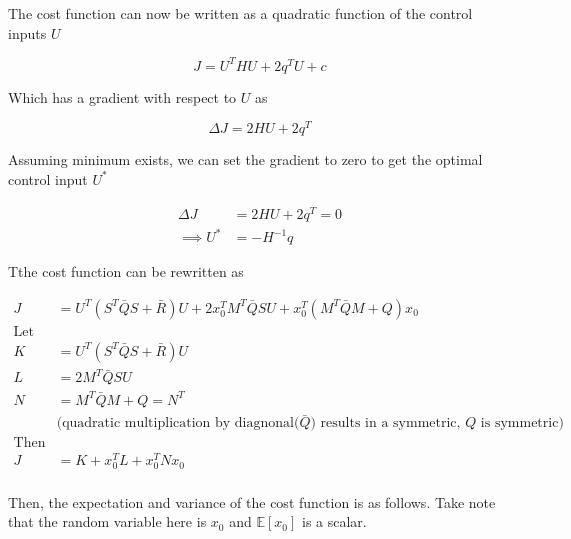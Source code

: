 \documentclass{article}
\begin{document}
The cost function can now be written as a quadratic function of the control inputs $U$

$$
J = U^T H U + 2 q^T U + c
$$

Which has a gradient with respect to $U$ as

$$
\Delta J = 2 H U + 2 q^T
$$

Assuming minimum exists, we can set the gradient to zero to get the optimal control input $U^*$

$$
\begin{aligned}
  \Delta J &= 2 H U + 2 q^T = 0 \\
  \implies U^* &= -H^{-1} q
\end{aligned}
$$


Tthe cost function can be rewritten as

$$
\begin{aligned}
  J &= U^T(S^T \bar{Q} S + \bar{R}) U + 2 x_0^T M^T \bar{Q} S U + x_0^T(M^T \bar{Q} M + Q) x_0 \\
  \text{Let}& \\
  K &= U^T(S^T \bar{Q} S + \bar{R}) U \\
  L &= 2 M^T \bar{Q} S U \\
  N &= M^T \bar{Q} M + Q = N^T \\
  &\text{(quadratic multiplication by diagnonal($\bar{Q}$) results in a symmetric, $Q$ is symmetric)} \\
  \text{Then}& \\
  J &= K + x_0^T L + x_0^T N x_0 \\
\end{aligned}
$$

Then, the expectation and variance of the cost function is as follows. Take note that the random variable here is $x_0$ and $\mathbb{E}[x_0]$ is a scalar.

\end{document}
